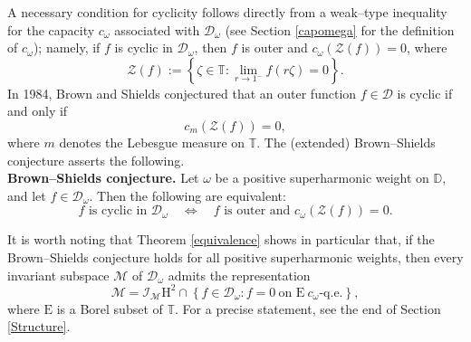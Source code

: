 \documentclass[12pt,reqno,a4paper]{amsart}
\newcommand{\cM}{{\mathcal{M}}}
\newcommand{\hH}{\mathrm{H^2 }}
\newcommand{\Ee}{\mathrm{E}}
\newcommand\TT{\mathbb{T}}
\newcommand\DD{\mathbb{D}}
\newcommand{\cZ}{{\mathcal{Z}}}
\newcommand{\cI}{{\mathcal{I}}}
\newcommand{\cD}{{\mathcal{D}}}
\numberwithin{equation}{section}
\begin{document}
A necessary condition for cyclicity follows directly from a weak--type inequality for the capacity \(c_\omega\) associated with \(\cD_\omega\) (see Section \ref{capomega} for the definition of \(c_\omega\)); namely, if \(f\) is cyclic in \(\cD_\omega\), then \(f\) is outer and \(c_{\omega}(\cZ(f)) = 0\), where  
\[
\cZ(f) := \left\{ \zeta \in \TT : \lim_{r \to 1^-} f(r\zeta) = 0 \right\}.
\]  
In 1984, Brown and Shields \cite{BS} conjectured that an outer function \(f \in \cD\) is cyclic if and only if 
\[
c_m(\mathcal{Z}(f))=0,
\]
where \(m\) denotes the Lebesgue measure on \(\TT\). The (extended) Brown--Shields conjecture asserts the following.\\

\textbf{Brown--Shields conjecture.} Let $\omega$ be a positive superharmonic weight on $\DD$, and let $f \in \cD_\omega$. Then the following are equivalent:
\[
f \text{ is cyclic in } \cD_\omega 
\quad \Longleftrightarrow \quad 
f \text{ is outer and } c_\omega(\mathcal{Z}(f)) = 0.
\]


It is worth noting that Theorem \ref{equivalence} shows in particular that, if the Brown--Shields conjecture holds for all positive superharmonic weights, then every invariant subspace $\cM$ of $\cD_\omega$ admits the representation
\[
\cM = \cI_\cM \hH \cap \left\{ f \in \cD_\omega : f = 0 \ \text{on } \Ee \ \text{$c_\omega$-q.e.} \right\},
\]
where $\Ee$ is a Borel subset of $\TT$. For a precise statement, see the end of Section \ref{Structure}.\\


\end{document}
